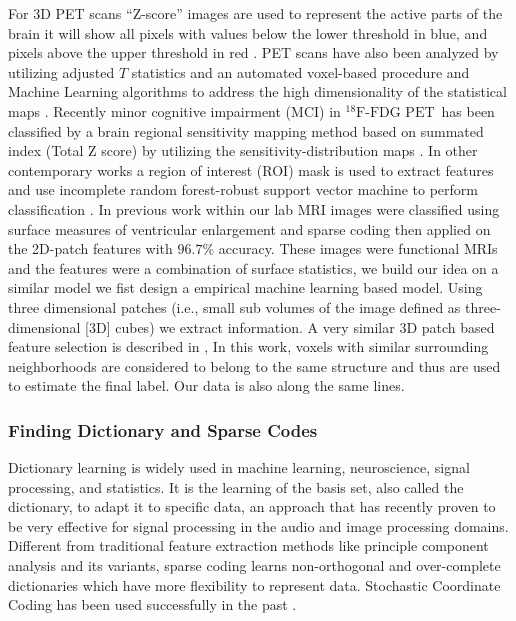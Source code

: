 \documentclass[authoryear,preprint,revi	ew,12pt]{elsarticle}
\newcommand{\FDGPET}   {$ ^{18}\textrm{F-FDG PET} $}
\begin{document}
For 3D PET scans ``Z-score'' images are used to represent the active parts of the brain it will show all pixels with values below the lower threshold in blue, and pixels above the upper threshold in red \citep{ishii2014pet}. PET scans have also been analyzed by utilizing adjusted $T$ statistics and an automated voxel-based procedure \citep{herholz2002discrimination} and Machine Learning algorithms to address the high dimensionality of the statistical maps \citep{illan201118} \citep{higdon2004comparison}. Recently minor cognitive impairment (MCI) in \FDGPET ~has been classified by a brain regional sensitivity mapping method based on summated index (Total Z score) by utilizing the sensitivity-distribution maps \citep{kakimoto2011new}. In other contemporary works a region of interest (ROI) mask is used to extract features and use incomplete random forest-robust support vector machine to perform classification \citep{lu2017early}. In previous work within our lab MRI images were classified using surface measures of ventricular enlargement and sparse coding then applied on the 2D-patch features \citep*{zhang2016hyperbolic,zhang2016applying} with $ 96.7 \% $ accuracy. These images were functional MRIs and the features were a combination of surface statistics, we build our idea on a similar model we fist design a empirical machine learning based model. Using three dimensional patches (i.e., small sub volumes of the image defined as three-dimensional [3D] cubes) we extract information. A very similar 3D patch based feature selection is described in \citep{coupe2011patch}, In  this work, voxels  with  similar  surrounding  neighborhoods  are  considered  to  belong  to  the  same  structure and thus are used to estimate the final label. Our data is also along the same lines. 

\subsubsection{Finding Dictionary and Sparse Codes}
\label{sec:dictionary_learning}
Dictionary learning is widely used in machine learning, neuroscience, signal processing, and statistics. It is the learning of the basis set, also called the dictionary, to adapt it to specific data, an approach that has recently proven to be very effective for signal processing in the audio and image processing domains. Different from traditional feature extraction methods like principle component analysis and its variants, sparse coding learns non-orthogonal and over-complete dictionaries which have more flexibility to represent data. Stochastic Coordinate Coding has been used successfully in the past \citep{lin2014stochastic,mairal2009online}. 
\end{document}
